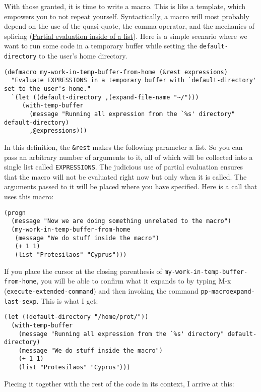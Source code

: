 \documentclass[11pt]{ctexart}
\begin{document}
With those granted, it is time to write a macro. This is like a template, which empowers you to not repeat yourself. Syntactically, a macro will most probably depend on the use of the quasi-quote, the comma operator, and the mechanics of splicing (\hyperref[sec:org771b57a]{Partial evaluation inside of a list}). Here is a simple scenario where we want to run some code in a temporary buffer while setting the \texttt{default-directory} to the user's home directory.

\begin{verbatim}
(defmacro my-work-in-temp-buffer-from-home (&rest expressions)
  "Evaluate EXPRESSIONS in a temporary buffer with `default-directory' set to the user's home."
  `(let ((default-directory ,(expand-file-name "~/")))
     (with-temp-buffer
       (message "Running all expression from the `%s' directory" default-directory)
       ,@expressions)))
\end{verbatim}

In this definition, the \texttt{\&rest} makes the following parameter a list. So you can pass an arbitrary number of arguments to it, all of which will be collected into a single list called \texttt{EXPRESSIONS}. The judicious use of partial evaluation ensures that the macro will not be evaluated right now but only when it is called. The arguments passed to it will be placed where you have specified. Here is a call that uses this macro:

\begin{verbatim}
(progn
  (message "Now we are doing something unrelated to the macro")
  (my-work-in-temp-buffer-from-home
   (message "We do stuff inside the macro")
   (+ 1 1)
   (list "Protesilaos" "Cyprus")))
\end{verbatim}

If you place the cursor at the closing parenthesis of \texttt{my-work-in-temp-buffer-from-home}, you will be able to confirm what it expands to by typing M-x (\texttt{execute-extended-command}) and then invoking the command \texttt{pp-macroexpand-last-sexp}. This is what I get:

\begin{verbatim}
(let ((default-directory "/home/prot/"))
  (with-temp-buffer
    (message "Running all expression from the `%s' directory" default-directory)
    (message "We do stuff inside the macro")
    (+ 1 1)
    (list "Protesilaos" "Cyprus")))
\end{verbatim}

Piecing it together with the rest of the code in its context, I arrive at this:
\end{document}
